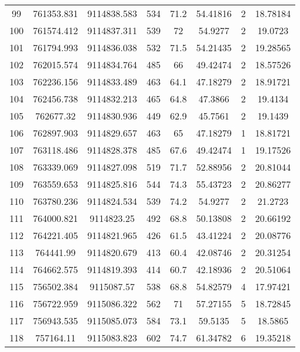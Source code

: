 \begin{longtable}{cccccccc}
99   & 761353.831      & 9114838.583      & 534     & 71.2  & 54.41816 & 2  & 18.78184 \\
100  & 761574.412      & 9114837.311      & 539     & 72    & 54.9277  & 2  & 19.0723  \\
101  & 761794.993      & 9114836.038      & 532     & 71.5  & 54.21435 & 2  & 19.28565 \\
102  & 762015.574      & 9114834.764      & 485     & 66    & 49.42474 & 2  & 18.57526 \\
103  & 762236.156      & 9114833.489      & 463     & 64.1  & 47.18279 & 2  & 18.91721 \\
104  & 762456.738      & 9114832.213      & 465     & 64.8  & 47.3866  & 2  & 19.4134  \\
105  & 762677.32       & 9114830.936      & 449     & 62.9  & 45.7561  & 2  & 19.1439  \\
106  & 762897.903      & 9114829.657      & 463     & 65    & 47.18279 & 1  & 18.81721 \\
107  & 763118.486      & 9114828.378      & 485     & 67.6  & 49.42474 & 1  & 19.17526 \\
108  & 763339.069      & 9114827.098      & 519     & 71.7  & 52.88956 & 2  & 20.81044 \\
109  & 763559.653      & 9114825.816      & 544     & 74.3  & 55.43723 & 2  & 20.86277 \\
110  & 763780.236      & 9114824.534      & 539     & 74.2  & 54.9277  & 2  & 21.2723  \\
111  & 764000.821      & 9114823.25       & 492     & 68.8  & 50.13808 & 2  & 20.66192 \\
112  & 764221.405      & 9114821.965      & 426     & 61.5  & 43.41224 & 2  & 20.08776 \\
113  & 764441.99       & 9114820.679      & 413     & 60.4  & 42.08746 & 2  & 20.31254 \\
114  & 764662.575      & 9114819.393      & 414     & 60.7  & 42.18936 & 2  & 20.51064 \\
115  & 756502.384      & 9115087.57       & 538     & 68.8  & 54.82579 & 4  & 17.97421 \\
116  & 756722.959      & 9115086.322      & 562     & 71    & 57.27155 & 5  & 18.72845 \\
117  & 756943.535      & 9115085.073      & 584     & 73.1  & 59.5135  & 5  & 18.5865  \\
118  & 757164.11       & 9115083.823      & 602     & 74.7  & 61.34782 & 6  & 19.35218 \\

\end{longtable}
